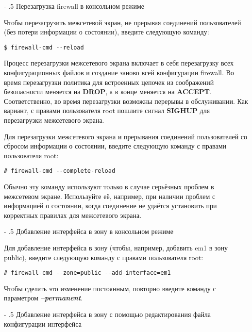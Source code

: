\documentclass[a4paper,10pt,twoside]{article}
\makeatletter
\renewcommand\paragraph{%
   \@startsection{paragraph}{4}{0mm}%
      {-\baselineskip}%
      {.5\baselineskip}%
      {\normalfont\normalsize\bfseries}}
\makeatother
\begin{document}
\paragraph{Перезагрузка firewall в консольном режиме}

Чтобы перезагрузить межсетевой экран, не прерывая соединений пользователей (без потери информации о состоянии), введите следующую команду:  
\begin{verbatim}
$ firewall-cmd --reload
\end{verbatim} 


Процесс перезагрузки межсетевого экрана включает в себя перезагрузку всех конфигурационных файлов и создание заново всей конфигурации firewall. Во время перезагрузки политика для встроенных цепочек из соображений безопасности меняется на \textbf{DROP}, а в конце меняется на \textbf{ACCEPT}. Соответственно, во время перезагрузки возможны перерывы в обслуживании. Как вариант, с правами пользователя root пошлите сигнал \textbf{SIGHUP} для перезагрузки межсетевого экрана.

Для перезагрузки межсетевого экрана и прерывания соединений пользователей со сбросом информации о состоянии, введите следующую команду с правами пользователя root: 
\begin{verbatim}
# firewall-cmd --complete-reload
\end{verbatim} 

Обычно эту команду используют только в случае серьёзных проблем в межсетевом экране. Используйте её, например, при наличии проблем с информацией о состоянии, когда соединение не удаётся установить при корректных правилах для межсетевого экрана.


\paragraph{Добавление интерфейса в зону в консольном режиме}

Для добавление интерфейса в зону (чтобы, например, добавить em1 в зону public), введите следующую команду с правами пользователя root: 

\begin{verbatim}
# firewall-cmd --zone=public --add-interface=em1
\end{verbatim} 
Чтобы сделать это изменение постоянным, повторно введите команду с параметром \textit{\textbf{--permanent}}.


\paragraph{Добавление интерфейса в зону с помощью редактирования файла конфигурации интерфейса}
\end{document}
